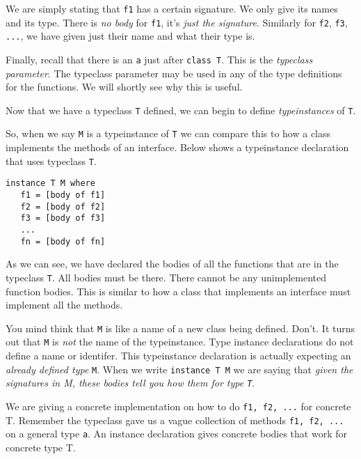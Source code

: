 We are simply stating that \lstinline{f1}
has a certain signature. We only give its names and its type. 
There is \textit{no body} for \lstinline{f1}, it's \textit{just the signature}. 
Similarly for \lstinline{f2}, \lstinline{f3}, \lstinline{...}, we have given just their name 
and what their type is.

Finally, recall that there is an \lstinline{a} just after \lstinline{class T}. 
This is the \textit{typeclass parameter}. The typeclass parameter may be used in any of the 
type definitions for the functions. We will shortly see why this is useful. 

Now that we have a typeclass \lstinline{T} defined, we can begin to define 
\textit{typeinstances} of \lstinline{T}. 


So, when we say \lstinline{M} is a typeinstance of \lstinline{T} 
we can compare this to how a class implements the methods of an interface. 
Below shows a typeinstance declaration that uses typeclass \lstinline{T}.

\begin{lstlisting}
instance T M where
   f1 = [body of f1]
   f2 = [body of f2]
   f3 = [body of f3]
   ...
   fn = [body of fn]
\end{lstlisting}

As we can see, we have declared the bodies of all the functions that are in 
the typeclass \lstinline{T}. All bodies must be there. 
There cannot be any unimplemented function bodies. This is similar to 
how a class that implements an interface must implement all the methods.

You mind think that \lstinline{M} is like a name of a new class being defined. 
Don't. It turns out that \lstinline{M} is \textit{not} the name of the typeinstance. 
Type instance declarations do not define a  name or identifer.
This typeinstance declaration is actually expecting 
an \textit{already defined type} \lstinline{M}.
When we write \lstinline{instance T M} we are saying
that \textit{given the signatures in M, these bodies tell you how them for type \lstinline{T}}. 

We are giving a concrete implementation on how to do  \lstinline{f1, f2, ...} 
for concrete T. Remember the typeclass gave us a vague collection 
of methods \lstinline{f1, f2, ...} on a general type \lstinline{a}. 
An instance declaration gives concrete bodies that work for concrete type T.

